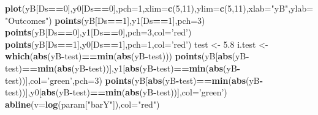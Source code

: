 \documentclass[]{book}
\newenvironment{Shaded}{\begin{snugshade}}{\end{snugshade}}
\newcommand{\KeywordTok}[1]{\textcolor[rgb]{0.13,0.29,0.53}{\textbf{#1}}}
\newcommand{\DataTypeTok}[1]{\textcolor[rgb]{0.13,0.29,0.53}{#1}}
\newcommand{\DecValTok}[1]{\textcolor[rgb]{0.00,0.00,0.81}{#1}}
\newcommand{\FloatTok}[1]{\textcolor[rgb]{0.00,0.00,0.81}{#1}}
\newcommand{\StringTok}[1]{\textcolor[rgb]{0.31,0.60,0.02}{#1}}
\newcommand{\OperatorTok}[1]{\textcolor[rgb]{0.81,0.36,0.00}{\textbf{#1}}}
\newcommand{\NormalTok}[1]{#1}
\theoremstyle{definition}
\theoremstyle{definition}
\theoremstyle{definition}
\theoremstyle{remark}
\begin{document}
\begin{Shaded}
\begin{Highlighting}[]
\KeywordTok{plot}\NormalTok{(yB[Ds}\OperatorTok{==}\DecValTok{0}\NormalTok{],y0[Ds}\OperatorTok{==}\DecValTok{0}\NormalTok{],}\DataTypeTok{pch=}\DecValTok{1}\NormalTok{,}\DataTypeTok{xlim=}\KeywordTok{c}\NormalTok{(}\DecValTok{5}\NormalTok{,}\DecValTok{11}\NormalTok{),}\DataTypeTok{ylim=}\KeywordTok{c}\NormalTok{(}\DecValTok{5}\NormalTok{,}\DecValTok{11}\NormalTok{),}\DataTypeTok{xlab=}\StringTok{"yB"}\NormalTok{,}\DataTypeTok{ylab=}\StringTok{"Outcomes"}\NormalTok{)}
\KeywordTok{points}\NormalTok{(yB[Ds}\OperatorTok{==}\DecValTok{1}\NormalTok{],y1[Ds}\OperatorTok{==}\DecValTok{1}\NormalTok{],}\DataTypeTok{pch=}\DecValTok{3}\NormalTok{)}
\KeywordTok{points}\NormalTok{(yB[Ds}\OperatorTok{==}\DecValTok{0}\NormalTok{],y1[Ds}\OperatorTok{==}\DecValTok{0}\NormalTok{],}\DataTypeTok{pch=}\DecValTok{3}\NormalTok{,}\DataTypeTok{col=}\StringTok{'red'}\NormalTok{)}
\KeywordTok{points}\NormalTok{(yB[Ds}\OperatorTok{==}\DecValTok{1}\NormalTok{],y0[Ds}\OperatorTok{==}\DecValTok{1}\NormalTok{],}\DataTypeTok{pch=}\DecValTok{1}\NormalTok{,}\DataTypeTok{col=}\StringTok{'red'}\NormalTok{)}
\NormalTok{test <-}\StringTok{ }\FloatTok{5.8}
\NormalTok{i.test <-}\StringTok{ }\KeywordTok{which}\NormalTok{(}\KeywordTok{abs}\NormalTok{(yB}\OperatorTok{-}\NormalTok{test)}\OperatorTok{==}\KeywordTok{min}\NormalTok{(}\KeywordTok{abs}\NormalTok{(yB}\OperatorTok{-}\NormalTok{test)))}
\KeywordTok{points}\NormalTok{(yB[}\KeywordTok{abs}\NormalTok{(yB}\OperatorTok{-}\NormalTok{test)}\OperatorTok{==}\KeywordTok{min}\NormalTok{(}\KeywordTok{abs}\NormalTok{(yB}\OperatorTok{-}\NormalTok{test))],y1[}\KeywordTok{abs}\NormalTok{(yB}\OperatorTok{-}\NormalTok{test)}\OperatorTok{==}\KeywordTok{min}\NormalTok{(}\KeywordTok{abs}\NormalTok{(yB}\OperatorTok{-}\NormalTok{test))],}\DataTypeTok{col=}\StringTok{'green'}\NormalTok{,}\DataTypeTok{pch=}\DecValTok{3}\NormalTok{)}
\KeywordTok{points}\NormalTok{(yB[}\KeywordTok{abs}\NormalTok{(yB}\OperatorTok{-}\NormalTok{test)}\OperatorTok{==}\KeywordTok{min}\NormalTok{(}\KeywordTok{abs}\NormalTok{(yB}\OperatorTok{-}\NormalTok{test))],y0[}\KeywordTok{abs}\NormalTok{(yB}\OperatorTok{-}\NormalTok{test)}\OperatorTok{==}\KeywordTok{min}\NormalTok{(}\KeywordTok{abs}\NormalTok{(yB}\OperatorTok{-}\NormalTok{test))],}\DataTypeTok{col=}\StringTok{'green'}\NormalTok{)}
\KeywordTok{abline}\NormalTok{(}\DataTypeTok{v=}\KeywordTok{log}\NormalTok{(param[}\StringTok{"barY"}\NormalTok{]),}\DataTypeTok{col=}\StringTok{"red"}\NormalTok{)}

\end{Highlighting}
\end{Shaded}
\end{document}

